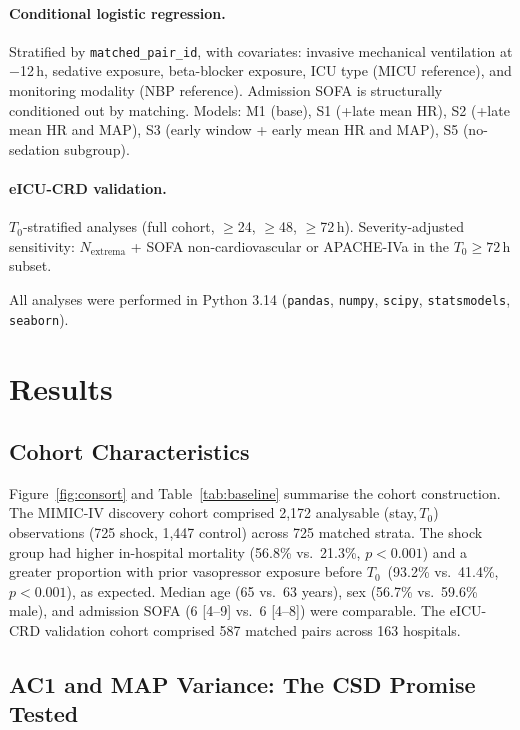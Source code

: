 \documentclass[12pt,a4paper]{article}
\newcommand{\Tzero}{$T_0$}
\begin{document}
\paragraph{Conditional logistic regression.}
Stratified by \texttt{matched\_pair\_id}, with covariates: invasive
mechanical ventilation at $-$12\,h, sedative exposure, beta-blocker exposure,
ICU type (MICU reference), and monitoring modality (NBP reference).
Admission SOFA is structurally conditioned out by matching.
Models: M1 (base), S1 (+late mean HR), S2 (+late mean HR and MAP),
S3 (early window + early mean HR and MAP), S5 (no-sedation subgroup).

\paragraph{eICU-CRD validation.}
$T_0$-stratified analyses (full cohort, $\geq$24, $\geq$48, $\geq$72\,h).
Severity-adjusted sensitivity: $N_{\text{extrema}}$ + SOFA non-cardiovascular
or APACHE-IVa in the $T_0\geq72$\,h subset.

All analyses were performed in Python 3.14 (\texttt{pandas}, \texttt{numpy},
\texttt{scipy}, \texttt{statsmodels}, \texttt{seaborn}).

\section{Results}
\label{sec:results}

\subsection{Cohort Characteristics}
\label{sec:cohort-chars}

Figure~\ref{fig:consort} and Table~\ref{tab:baseline} summarise the cohort
construction.
The MIMIC-IV discovery cohort comprised 2,172 analysable (stay,\,\Tzero)
observations (725 shock, 1,447 control) across 725 matched strata.
The shock group had higher in-hospital mortality (56.8\% vs.\ 21.3\%,
$p<0.001$) and a greater proportion with prior vasopressor exposure before
\Tzero\ (93.2\% vs.\ 41.4\%, $p<0.001$), as expected.
Median age (65 vs.\ 63 years), sex (56.7\% vs.\ 59.6\% male), and
admission SOFA (6 [4--9] vs.\ 6 [4--8]) were comparable.
The eICU-CRD validation cohort comprised 587 matched pairs across 163
hospitals.

\subsection{AC1 and MAP Variance: The CSD Promise Tested}
\label{sec:ac1results}
\end{document}
